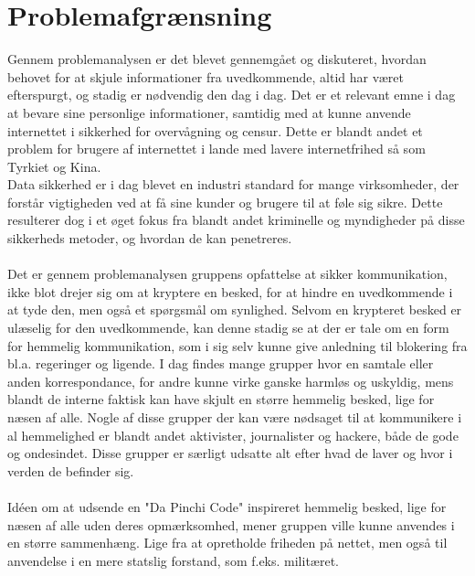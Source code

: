 \section{Problemafgrænsning}
Gennem problemanalysen er det blevet gennemgået og diskuteret, hvordan behovet for at skjule informationer fra uvedkommende, altid har været efterspurgt, og stadig er nødvendig den dag i dag. Det er et relevant emne i dag at bevare sine personlige informationer, samtidig med at kunne anvende internettet i sikkerhed for overvågning og censur. Dette er blandt andet et problem for brugere af internettet i lande med lavere internetfrihed så som Tyrkiet og Kina.\\
\noindent
Data sikkerhed er i dag blevet en industri standard for mange virksomheder, der forstår vigtigheden ved at få sine kunder og brugere til at føle sig sikre. Dette resulterer dog i et øget fokus fra blandt andet kriminelle og myndigheder på disse sikkerheds metoder, og hvordan de kan penetreres.
\\\\
Det er gennem problemanalysen gruppens opfattelse at sikker kommunikation, ikke blot drejer sig om at kryptere en besked, for at hindre en uvedkommende i at tyde den, men også et spørgsmål om synlighed. Selvom en krypteret besked er ulæselig for den uvedkommende, kan denne stadig se at der er tale om en form for hemmelig kommunikation, som i sig selv kunne give anledning til blokering fra bl.a. regeringer og ligende. I dag findes mange grupper hvor en samtale eller anden korrespondance, for andre kunne virke ganske harmløs og uskyldig, mens blandt de interne faktisk kan have skjult en større hemmelig besked, lige for næsen af alle. Nogle af disse grupper der kan være nødsaget til at kommunikere i al hemmelighed er blandt andet aktivister, journalister og hackere, både de gode og ondesindet. Disse grupper er særligt udsatte alt efter hvad de laver og hvor i verden de befinder sig.
\\\\
Idéen om at udsende en "Da Pinchi Code" inspireret hemmelig besked, lige for næsen af alle uden deres opmærksomhed, mener gruppen ville kunne anvendes i en større sammenhæng. Lige fra at opretholde friheden på nettet, men også til anvendelse i en mere statslig forstand, som f.eks. militæret.
